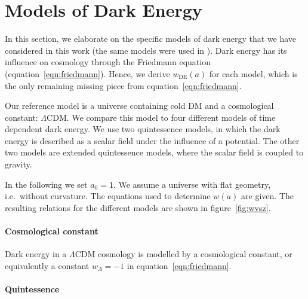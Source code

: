 \section{Models of Dark Energy}


\label{ap:modelsofDE}

In this section, we elaborate on the specific models of dark energy that we have considered in this work (the same models were used in \citet{deboni11}). Dark energy has its influence on cosmology through the Friedmann equation (equation~\ref{eqn:friedmann}). Hence, we derive $w_\mathrm{DE}(a)$ for each model, which is the only remaining missing piece from equation~\ref{eqn:friedmann}.

Our reference model is a universe containing cold DM and a cosmological constant: $\Lambda$CDM. We compare this model to four different models of time dependent dark energy. We use two quintessence models, in which the dark energy is described as a scalar field under the influence of a potential. The other two models are extended quintessence models, where the scalar field is coupled to gravity.

In the following we set $a_0 = 1$. We assume a universe with flat geometry, i.e.\ without curvature. The equations used to determine $w(a)$ are given. The resulting relations for the different models are shown in figure~\ref{fig:wvsz}.

\paragraph*{Cosmological constant}

Dark energy in a $\Lambda$CDM cosmology is modelled by a cosmological constant, or equivalently a constant $w_\Lambda = -1$ in equation~\ref{eqn:friedmann}.

\paragraph*{Quintessence}


